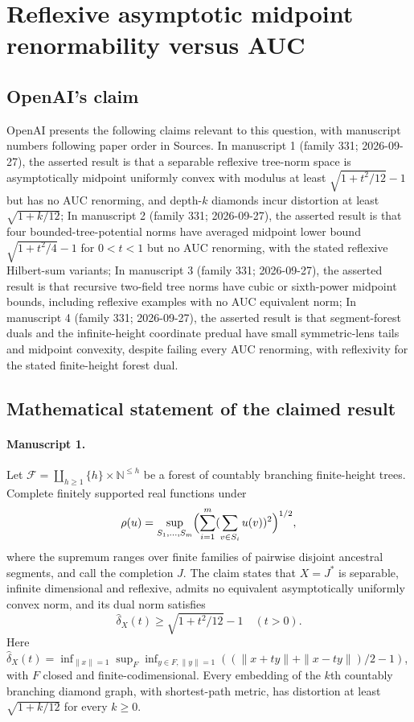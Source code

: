 \documentclass[11pt]{article}
\begin{document}
\section*{Reflexive asymptotic midpoint renormability versus AUC}

\subsection{OpenAI's claim}
OpenAI presents the following claims relevant to this question, with manuscript numbers following paper order in Sources. In manuscript 1 (family 331; 2026-09-27), the asserted result is that a separable reflexive tree-norm space is asymptotically midpoint uniformly convex with modulus at least $\sqrt{1+t^2/12}-1$ but has no AUC renorming, and depth-$k$ diamonds incur distortion at least $\sqrt{1+k/12}$; In manuscript 2 (family 331; 2026-09-27), the asserted result is that four bounded-tree-potential norms have averaged midpoint lower bound $\sqrt{1+t^2/4}-1$ for $0<t<1$ but no AUC renorming, with the stated reflexive Hilbert-sum variants; In manuscript 3 (family 331; 2026-09-27), the asserted result is that recursive two-field tree norms have cubic or sixth-power midpoint bounds, including reflexive examples with no AUC equivalent norm; In manuscript 4 (family 331; 2026-09-27), the asserted result is that segment-forest duals and the infinite-height coordinate predual have small symmetric-lens tails and midpoint convexity, despite failing every AUC renorming, with reflexivity for the stated finite-height forest dual.

\subsection{Mathematical statement of the claimed result}
\paragraph{Manuscript 1.}
Let $\mathcal F=\coprod_{h\ge1}\{h\}\times\mathbb N^{\le h}$ be a forest of countably branching finite-height trees. Complete finitely supported real functions under
\[
 \rho(u)=\sup_{S_1,\ldots,S_m}\Bigl(\sum_{i=1}^m(\sum_{v\in S_i}u(v))^2\Bigr)^{1/2},
\]
where the supremum ranges over finite families of pairwise disjoint ancestral segments, and call the completion $J$. The claim states that $X=J^*$ is separable, infinite dimensional and reflexive, admits no equivalent asymptotically uniformly convex norm, and its dual norm satisfies
\[
 \widehat\delta_X(t)\ge\sqrt{1+t^2/12}-1\quad(t>0).
\]
Here $\widehat\delta_X(t)=\inf_{\|x\|=1}\sup_F\inf_{y\in F,\|y\|=1}((\|x+ty\|+\|x-ty\|)/2-1)$, with $F$ closed and finite-codimensional. Every embedding of the $k$th countably branching diamond graph, with shortest-path metric, has distortion at least $\sqrt{1+k/12}$ for every $k\ge0$.
\end{document}
